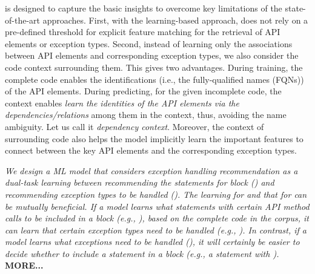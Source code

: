 
{\tool} is designed to capture the basic insights to overcome key
limitations of the state-of-the-art approaches. First, with the
learning-based approach, {\tool} does not rely on a pre-defined
threshold for explicit feature matching for the retrieval of API
elements or exception types. Second, instead of learning only the
associations between API elements and corresponding exception types,
we also consider the code context surrounding them. This gives {\tool}
two advantages. During training, the complete code enables the
identifications (i.e., the fully-qualified names (FQNs)) of the API
elements. During predicting, for the given incomplete code, the
context enables {\tool} {\em learn the identities of the API elements
  via the dependencies/relations} among them in the context, thus,
avoiding the name ambiguity. Let us call it {\em dependency
  context}. Moreover, the context of surrounding code also helps the
model implicitly learn the important features to connect between the
key API elements and the corresponding exception types.

{\em We design a ML model that considers exception handling recommendation
as a dual-task learning between recommending the statements for
 block ({\xstate}) and recommending exception types to
be handled ({\xtype}). The learning for {\xstate} and that for
{\xtype} can be mutually beneficial. If a model learns what statements
with certain API method calls to be included in a 
block (e.g., ), based on the complete code in
the corpus, it can learn that certain exception types need to be
handled (e.g., ). In contrast, if a model learns
what exceptions need to be handled
(), it will certainly be
easier to decide whether to include a statement in a 
block (e.g., a statement with
).} {\bf MORE...}

